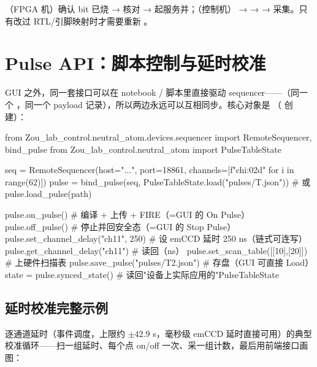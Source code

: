 \documentclass[11pt,oneside,openany]{book}
\begin{document}
\begin{notebox}
（FPGA 机）确认 bit 已烧 →  核对 →  起服务并；（控制机） →  →  → 采集。只有改过 RTL/引脚映射时才需要重新 。
\end{notebox}

\chapter{Pulse API：脚本控制与延时校准}

GUI 之外，同一套接口可以在 notebook / 脚本里直接驱动 sequencer——（同一个 ，同一个 payload 记录），所以两边永远可以互相同步。核心对象是 （ 创建）：

\begin{codeblock}
from Zou_lab_control.neutral_atom.devices.sequencer import RemoteSequencer, bind_pulse
from Zou_lab_control.neutral_atom import PulseTableState

seq = RemoteSequencer(host="...", port=18861, channels=[f"ch{i:02d}" for i in range(62)])
pulse = bind_pulse(seq, PulseTableState.load("pulses/T.json"))   # 或 pulse.load_pulse(path)

pulse.on_pulse()                      # 编译 + 上传 + FIRE（=GUI 的 On Pulse）
pulse.off_pulse()                     # 停止并回安全态（=GUI 的 Stop Pulse）
pulse.set_channel_delay("ch11", 250)  # 设 emCCD 延时 250 ns（链式可连写）
pulse.get_channel_delay("ch11")       # 读回（ns）
pulse.set_scan_table([[10],[20]])     # 上硬件扫描表
pulse.save_pulse("pulses/T2.json")    # 存盘（GUI 可直接 Load）
state = pulse.synced_state()          # 读回"设备上实际应用的"PulseTableState
\end{codeblock}

\section{延时校准完整示例}

逐通道延时（事件调度，上限约 $\pm 42.9$ s，毫秒级 emCCD 延时直接可用）的典型校准循环——扫一组延时、每个点 on/off 一次、采一组计数，最后用前端接口画图：
\end{document}
